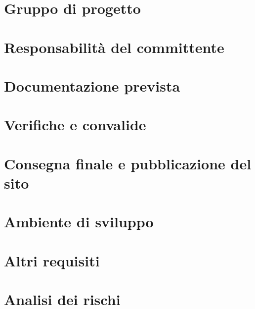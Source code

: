 \documentclass[a4paper,12pt,hidelinks]{report}
\begin{document}
\section{Gruppo di progetto}
\section{Responsabilità del committente}
\section{Documentazione prevista}
\section{Verifiche e convalide}
\section{Consegna finale e pubblicazione del sito}
\section{Ambiente di sviluppo}
\section{Altri requisiti}
\section{Analisi dei rischi}
\end{document}
